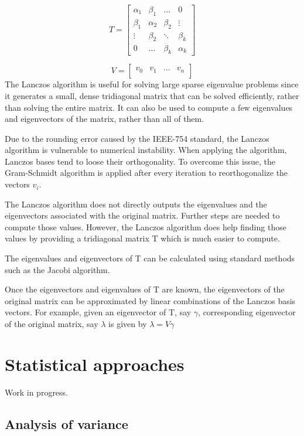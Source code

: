 \documentclass{book}
\begin{document}
$$
T=
\begin{bmatrix}
  \alpha_{1} & \beta_{1} & \ldots & 0\\
  \beta_{1} & \alpha_{2} & \beta_{2} & \vdots \\
  \vdots & \beta_{2} &  \ddots & \beta_{k} \\
  0 & \ldots & \beta_{k} & \alpha_{k}
\end{bmatrix}
$$

$$
V=
\begin{bmatrix}
  v_{0} & v_{1} & \ldots & v_{n} \\
\end{bmatrix}
$$
The Lanczos algorithm is useful for solving large sparse eigenvalue problems since it generates a small, dense tridiagonal matrix that can be solved efficiently, rather than solving the entire matrix. It can also be used to compute a few eigenvalues and eigenvectors of the matrix, rather than all of them.

Due to the rounding error caused by the IEEE-754 standard, the Lanczos algorithm is vulnerable to numerical instability. When applying the algorithm, Lanczos bases tend to loose their orthogonality. To overcome this issue, the Gram-Schmidt algorithm is applied after every iteration to reorthogonalize the vectors $v_{i}$.

The Lanczos algorithm does not directly outputs the eigenvalues and the eigenvectors associated with the original matrix. Further steps are needed to compute those values. However, the Lanczos algorithm does help finding those values by providing a tridiagonal matrix T which is much easier to compute. 

  The eigenvalues and eigenvectors of T can be calculated using standard methods such as the Jacobi algorithm. 

  Once the eigenvectors and eigenvalues of T are known, the eigenvectors of the original matrix can be approximated by linear combinations of the Lanczos basis vectors. For example, given an eigenvector of T, say $\gamma$, corresponding eigenvector of the original matrix, say $\lambda$ is given by $\lambda = V\gamma$ 
  
\section{Statistical approaches}

Work in progress.
\subsection{Analysis of variance}
\end{document}
